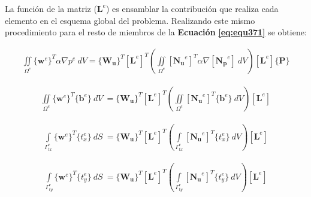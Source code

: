 La función de la matriz ($\mathbf{L}^e$) es ensamblar la contribución que realiza cada elemento en el esquema global del problema. Realizando este mismo procedimiento para el resto de miembros de la  \textbf{Ecuación} \textbf{\ref{eq:equ371}} se obtiene:

\begin{ceqn} %
\begin{gather}\label{eq:equ375}
\iint \limits_{\Omega^e} \{\mathbf{w}^e\}^T \alpha \nabla p^e\ dV = 
\{\mathbf{W_u}\}^T \left[\mathbf{L}^e\right]^T \left( \iint \limits_{\Omega^e}  [\mathbf{N_u}^e]^T \alpha \nabla [\mathbf{N_p}^e]\ dV \right) \left[\mathbf{L}^e\right] \{\mathbf{P}\}
\end{gather}   
\end{ceqn}

\begin{ceqn} %
\begin{gather}\label{eq:equ376}
\iint \limits_{\Omega^e} \{\mathbf{w}^e\}^T \{\mathbf{b}^e\}\ dV\ = 
\{\mathbf{W_u}\}^T \left[\mathbf{L}^e\right]^T \left( \iint \limits_{\Omega^e}  [\mathbf{N_u}^e]^T  \{\mathbf{b}^e\}\ dV \right) \left[\mathbf{L}^e\right]
\end{gather}   
\end{ceqn}

\begin{ceqn} %
\begin{gather}\label{eq:equ377}
\int \limits_{\Gamma^e_{tx}} \{\mathbf{w}^e\}^T \{t^e_x\}\ dS\ = 
\{\mathbf{W_u}\}^T \left[\mathbf{L}^e\right]^T \left( \int \limits_{\Gamma^e_{tx}} [\mathbf{N_u}^e]^T  \{t^e_x\}\ dV \right) \left[\mathbf{L}^e\right]
\end{gather}   
\end{ceqn}

\begin{ceqn} %
\begin{gather}\label{eq:equ378}
\int \limits_{\Gamma^e_{ty}} \{\mathbf{w}^e\}^T \{t^e_y\}\ dS\ = 
\{\mathbf{W_u}\}^T \left[\mathbf{L}^e\right]^T \left( \int \limits_{\Gamma^e_{ty}} [\mathbf{N_u}^e]^T  \{t^e_y\}\ dV \right) \left[\mathbf{L}^e\right]
\end{gather}   
\end{ceqn}

